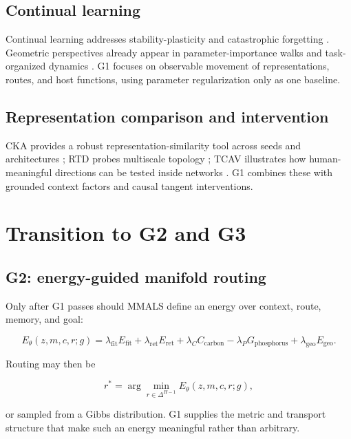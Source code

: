 \documentclass[11pt,a4paper]{article}
\newcommand{\simplex}{\Delta^{H-1}}
\begin{document}
\subsection{Continual learning}

Continual learning addresses stability-plasticity and catastrophic forgetting \citep{parisi2019continual,kirkpatrick2017ewc}. Geometric perspectives already appear in parameter-importance walks and task-organized dynamics \citep{chaudhry2018riemannian,duncker2020dynamics}. G1 focuses on observable movement of representations, routes, and host functions, using parameter regularization only as one baseline.

\subsection{Representation comparison and intervention}

CKA provides a robust representation-similarity tool across seeds and architectures \citep{kornblith2019cka}; RTD probes multiscale topology \citep{barannikov2022rtd}; TCAV illustrates how human-meaningful directions can be tested inside networks \citep{kim2018tcav}. G1 combines these with grounded context factors and causal tangent interventions.

\section{Transition to G2 and G3}

\subsection{G2: energy-guided manifold routing}

Only after G1 passes should MMALS define an energy over context, route, memory, and goal:

\begin{equation}
 E_\theta(z,m,c,r;g)=
 \lambda_{\mathrm{fit}}E_{\mathrm{fit}}
 +\lambda_{\mathrm{ret}}E_{\mathrm{ret}}
 +\lambda_C C_{\mathrm{carbon}}
 -\lambda_P G_{\mathrm{phosphorus}}
 +\lambda_{\mathrm{geo}}E_{\mathrm{geo}}.
\end{equation}

Routing may then be

\begin{equation}
 r^*=\arg\min_{r\in\simplex}E_\theta(z,m,c,r;g),
\end{equation}

or sampled from a Gibbs distribution. G1 supplies the metric and transport structure that make such an energy meaningful rather than arbitrary.
\end{document}
